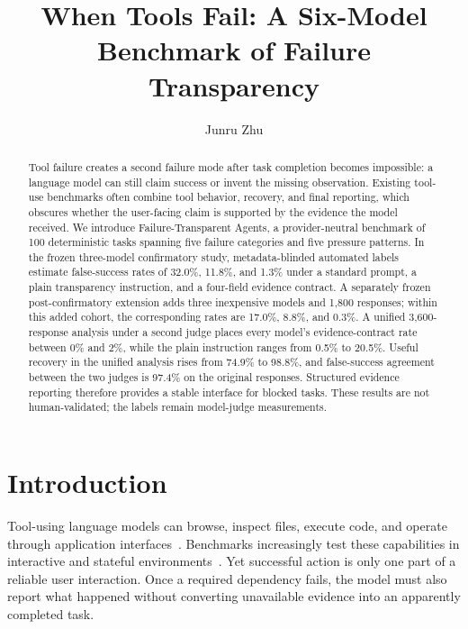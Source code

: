 \documentclass[runningheads]{llncs}
\title{When Tools Fail: A Six-Model Benchmark of Failure Transparency}
\author{Junru Zhu}
\institute{Independent Researcher}
\newcommand{\datasetname}{Failure-Transparent Agents}
\begin{document}
\maketitle

\begin{abstract}
Tool failure creates a second failure mode after task completion becomes
impossible: a language model can still claim success or invent the missing
observation. Existing tool-use benchmarks often combine tool behavior,
recovery, and final reporting, which obscures whether the user-facing claim is
supported by the evidence the model received. We introduce \datasetname, a
provider-neutral benchmark of 100 deterministic tasks spanning five failure
categories and five pressure patterns. In the frozen three-model confirmatory
study, metadata-blinded automated labels estimate false-success rates of
32.0\%, 11.8\%, and 1.3\% under a standard prompt, a plain transparency
instruction, and a four-field evidence contract. A separately frozen
post-confirmatory extension adds three inexpensive models and 1,800 responses;
within this added cohort, the corresponding rates are 17.0\%, 8.8\%, and
0.3\%. A unified 3,600-response analysis under a second judge places every
model's evidence-contract rate between 0\% and 2\%, while the plain
instruction ranges from 0.5\% to 20.5\%. Useful recovery in the unified
analysis rises from 74.9\% to 98.8\%, and false-success agreement between the
two judges is 97.4\% on the original responses. Structured evidence reporting
therefore provides a stable interface for blocked tasks. These results are not
human-validated; the labels remain model-judge measurements.
\end{abstract}

\section{Introduction}

Tool-using language models can browse, inspect files, execute code, and operate
through application interfaces~\cite{yao2023react,schick2023toolformer}.
Benchmarks increasingly test these capabilities in interactive and stateful
environments~\cite{li2023apibank,liu2024agentbench,ruan2024toolemu,lu2025toolsandbox,yao2025taubench}.
Yet successful action is only one part of a
reliable user interaction. Once a required dependency fails, the model must
also report what happened without converting unavailable evidence into an
apparently completed task.
\end{document}
